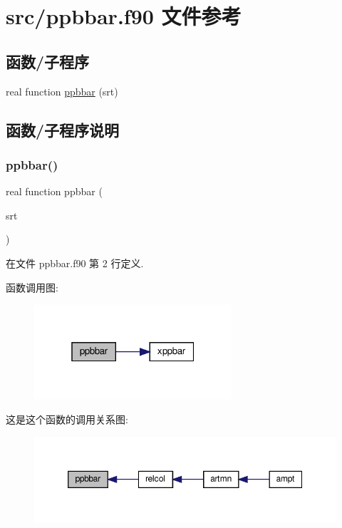 \hypertarget{ppbbar_8f90}{}\section{src/ppbbar.f90 文件参考}
\label{ppbbar_8f90}
\subsection*{函数/子程序}
\begin{DoxyCompactItemize}
\item 
real function \mbox{\hyperlink{ppbbar_8f90_ac159f81049f353497109812081769e7f}{ppbbar}} (srt)
\end{DoxyCompactItemize}


\subsection{函数/子程序说明}
\mbox{\label{ppbbar_8f90_ac159f81049f353497109812081769e7f}} 
\subsubsection{\texorpdfstring{ppbbar()}{ppbbar()}}
{\footnotesize\ttfamily real function ppbbar (\begin{DoxyParamCaption}\item[{}]{srt }\end{DoxyParamCaption})}



在文件 ppbbar.\+f90 第 2 行定义.

函数调用图\+:
\nopagebreak
\begin{figure}[H]
\begin{center}
\leavevmode
\includegraphics[width=208pt]{ppbbar_8f90_ac159f81049f353497109812081769e7f_cgraph}
\end{center}
\end{figure}
这是这个函数的调用关系图\+:
\nopagebreak
\begin{figure}[H]
\begin{center}
\leavevmode
\includegraphics[width=350pt]{ppbbar_8f90_ac159f81049f353497109812081769e7f_icgraph}
\end{center}
\end{figure}
